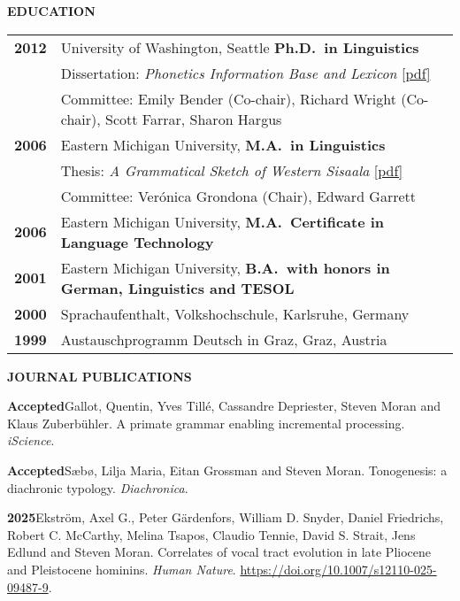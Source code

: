 \documentclass[11pt]{article}
\newcommand{\hangpara}{
 \setlength{\parindent}{0in} %
 \hangindent=0.42in %
}
\begin{document}
\clearpage
\begin{flushleft}
{\bf EDUCATION}
\end{flushleft}
\begin{tabular}{ll}
\bf 2012 & University of Washington, Seattle \textbf{Ph.D.\ in Linguistics} \\
& Dissertation: \textit{Phonetics Information Base and Lexicon} \href{https://digital.lib.washington.edu/researchworks/handle/1773/22452}{[pdf]} \\
& Committee: Emily Bender (Co-chair), Richard Wright (Co-chair), Scott Farrar, Sharon Hargus \\
\bf 2006 & Eastern Michigan University, \textbf{M.A.\ in Linguistics}  \\
& Thesis: {\it A Grammatical Sketch of Western Sisaala} \href{http://commons.emich.edu/theses/73/}{[pdf]}\\
& Committee: Verónica Grondona (Chair), Edward Garrett \\
\bf 2006 & Eastern Michigan University, \textbf{M.A.\ Certificate in Language Technology}  \\
\bf 2001 & Eastern Michigan University, \textbf{B.A.\ with honors in German, Linguistics and TESOL}  \\
\bf 2000 & Sprachaufenthalt, Volkshochschule, Karlsruhe, Germany \\
\bf 1999 & Austauschprogramm Deutsch in Graz, Graz, Austria \\
\end{tabular}

\vskip 18pt
\begin{flushleft}
{\bf JOURNAL PUBLICATIONS}
\end{flushleft}

\hangpara
{\bf Accepted}\hspace{1ex}Gallot, Quentin, Yves Tillé, Cassandre Depriester, Steven Moran and Klaus Zuberbühler. A primate grammar enabling incremental processing. \textit{iScience}.

\vskip 6pt
\hangpara
{\bf Accepted}\hspace{1ex}Sæbø, Lilja Maria, Eitan Grossman and Steven Moran. Tonogenesis: a diachronic typology. \textit{Diachronica}.

\vskip 6pt
\hangpara
{\bf 2025}\hspace{1ex}Ekström, Axel G., Peter Gärdenfors, William D. Snyder, Daniel Friedrichs, Robert C. McCarthy, Melina Tsapos, Claudio Tennie, David S. Strait, Jens Edlund and Steven Moran. Correlates of vocal tract evolution in late Pliocene and Pleistocene hominins. \textit{Human Nature}. \url{https://doi.org/10.1007/s12110-025-09487-9}. %
\end{document}
